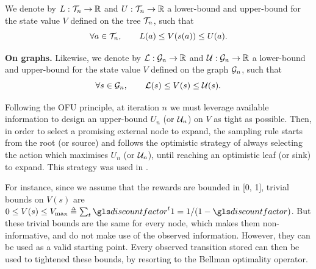 \begin{definition}
	\begin{leftbar}[defnbar]
	\leavevmode\newline
	 We denote by $L:\mathcal{T}_n \rightarrow \mathbb{R}$ and  $U:\mathcal{T}_n \rightarrow \mathbb{R}$ a lower-bound and upper-bound for the state value $V$ defined on the tree $\mathcal{T}_n$, such that
	\begin{equation*}
	\forall a\in\mathcal{T}_n, \qquad L(a) \leq V(s(a)) \leq U(a).
	\end{equation*}
	
	{\textbf{On graphs.}} Likewise, we denote by $\mathcal{L}:\mathcal{G}_n \rightarrow \mathbb{R}$ and  $\mathcal{U}:\mathcal{G}_n \rightarrow \mathbb{R}$ a lower-bound and upper-bound for the state value $V$ defined on the graph $\mathcal{G}_n$, such that
	\begin{equation*}
	\forall s\in\mathcal{G}_n, \qquad \mathcal{L}(s) \leq V(s) \leq \mathcal{U}(s).
	\end{equation*}
	\end{leftbar}
\end{definition}

Following the \gls{OFU} principle, at iteration $n$ we must leverage available information to design an upper-bound $U_n$ (or $\mathcal{U}_n$) on $V$ as tight as possible. Then, in order to select a promising external node to expand, the sampling rule starts from the root (or source) and follows the optimistic strategy of always selecting the action which maximises $U_n$ (or $\mathcal{U}_n$), until reaching an optimistic leaf (or sink) to expand. This strategy was used in \citep[\eg][]{Kocsis2006, Hren2008, Bubeck2010, Busoniu2012optimistic}.

For instance, since we assume that the rewards are bounded in [0, 1], trivial bounds on $V(s)$ are
$0 \leq V(s) \leq V_{\max} \eqdef \sum_t \discount^t 1 ={1}/({1-\discount})$. But these trivial bounds are the same for every node, which makes them non-informative, and do not make use of the observed information. However, they can be used as a valid starting point. Every observed transition stored can then be used to tightened these bounds, by resorting to the Bellman optimality operator.

